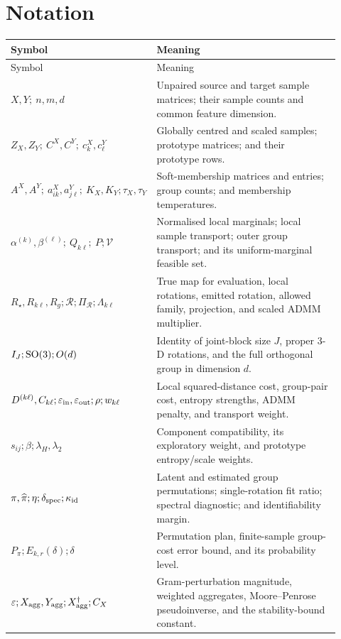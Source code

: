 \documentclass[10pt,a4paper]{article}
\begin{document}
\section{Notation}
\begin{longtable}{p{0.35\linewidth}p{0.57\linewidth}}
\toprule Symbol & Meaning\\\midrule
\endfirsthead\toprule Symbol & Meaning\\\midrule\endhead
$X,Y;\ n,m,d$ & Unpaired source and target sample matrices; their sample counts and common feature dimension.\\
$Z_X,Z_Y;\ C^X,C^Y;\ c_k^X,c_\ell^Y$ & Globally centred and scaled samples; prototype matrices; and their prototype rows.\\
$A^X,A^Y;\ a_{ik}^X,a_{j\ell}^Y;\ K_X,K_Y;\tau_X,\tau_Y$ & Soft-membership matrices and entries; group counts; and membership temperatures.\\
$\alpha^{(k)},\beta^{(\ell)};\ Q_{k\ell};\ P;\mathcal V$ & Normalised local marginals; local sample transport; outer group transport; and its uniform-marginal feasible set.\\
$R_\star,R_{k\ell},R_g;\mathcal R;\Pi_{\mathcal R};\Lambda_{k\ell}$ & True map for evaluation, local rotations, emitted rotation, allowed family, projection, and scaled ADMM multiplier.\\
$I_J;\mathrm{SO}(3);O(d)$ & Identity of joint-block size $J$, proper 3-D rotations, and the full orthogonal group in dimension $d$.\\
$D^{(k\ell)},C_{k\ell};\varepsilon_{\rm in},\varepsilon_{\rm out};\rho;w_{k\ell}$ & Local squared-distance cost, group-pair cost, entropy strengths, ADMM penalty, and transport weight.\\
$s_{ij};\beta;\lambda_H,\lambda_2$ & Component compatibility, its exploratory weight, and prototype entropy/scale weights.\\
$\pi,\widehat\pi;\eta;\delta_{\rm spec};\kappa_{\rm id}$ & Latent and estimated group permutations; single-rotation fit ratio; spectral diagnostic; and identifiability margin.\\
$P_\pi;E_{k,r}(\delta);\delta$ & Permutation plan, finite-sample group-cost error bound, and its probability level.\\
$\varepsilon;X_{\rm agg},Y_{\rm agg};X_{\rm agg}^{\dagger};C_X$ & Gram-perturbation magnitude, weighted aggregates, Moore--Penrose pseudoinverse, and the stability-bound constant.\\
\bottomrule
\end{longtable}

\end{document}
